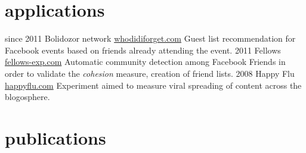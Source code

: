 \documentclass[]{friggeri-cv}
\begin{document}
\section{applications}

\begin{entrylist}
  \entry
    {since 2011}
    {Bolidozor network}
    {\href{http://whodidiforget.com}{whodidiforget.com}}
    {Guest list recommendation for Facebook events based on friends already attending the event.}
  \entry
    {2011}
    {Fellows}
    {\href{http://fellows-exp.com}{fellows-exp.com}}
    {Automatic community detection among Facebook Friends in order to validate the \emph{cohesion} measure, creation of friend lists.}
  \entry
    {2008}
    {Happy Flu}
    {\href{http://happyflu.com}{happyflu.com}}
    {Experiment aimed to measure viral spreading of content across the blogosphere.}
\end{entrylist}

\section{publications}


\begin{refsection}
  \nocite{*}
  \printbibliography[sorting=chronological, type=inproceedings, title={international peer-reviewed conferences/proceedings}, notkeyword={france}, heading=subbibliography]
\end{refsection}
\begin{refsection}
  \nocite{*}
  \printbibliography[sorting=chronological, type=inproceedings, title={local peer-reviewed conferences/proceedings}, keyword={france}, heading=subbibliography]
\end{refsection}
\end{document}
